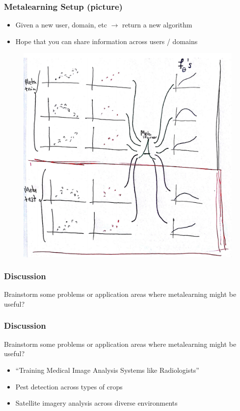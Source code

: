 \documentclass[10pt,mathserif]{beamer}
\begin{document}
\begin{frame}
  \frametitle{Metalearning Setup (picture)}
\begin{itemize}
\item Given a new user, domain, etc $\rightarrow$ return a new algorithm
\item Hope that you can share information across users / domains
\end{itemize}
 \begin{figure}[ht]
   \centering
   \includegraphics[width=0.45\paperwidth]{figure/metalearning_setup_curves}
   \caption{\label{fig:metalearning_setup_curves} }
 \end{figure}
\end{frame}

\begin{frame}
  \frametitle{Discussion}
  Brainstorm some problems or application areas where metalearning might
  be useful?
\end{frame}

\begin{frame}
  \frametitle{Discussion}
  Brainstorm some problems or application areas where metalearning might
  be useful?
  \begin{itemize}
  \item ``Training Medical Image Analysis Systems like Radiologists''
  \item Pest detection across types of crops
  \item Satellite imagery analysis across diverse environments
  \end{itemize}
\end{frame}
\end{document}
